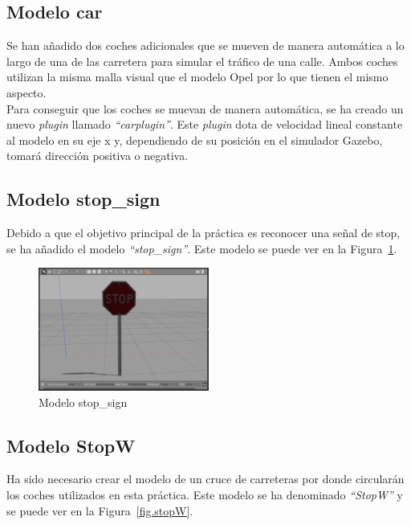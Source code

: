 \subsection{Modelo car}
Se han añadido dos coches adicionales que se mueven de manera automática a lo largo de una de las carretera para simular el tráfico de una calle. Ambos coches utilizan la misma malla visual que el modelo Opel por lo que tienen el mismo aspecto. \\

Para conseguir que los coches se muevan de manera automática, se ha creado un nuevo \textit{plugin} llamado \textit{``carplugin''}. Este \textit{plugin} dota de velocidad lineal constante al modelo en su eje x y, dependiendo de su posición en el simulador Gazebo, tomará dirección positiva o negativa.


\subsection{Modelo stop\_sign}
Debido a que el objetivo principal de la práctica es reconocer una señal de stop, se ha añadido el modelo \textit{``stop\_sign''}. Este modelo se puede ver en la Figura~\ref{fig.stopSign}.

\begin{figure}[H]
  \begin{center}
    \includegraphics[width=0.5\textwidth]{figures/Stop/stopSign.png}
		\caption{Modelo stop\_sign}
		\label{fig.stopSign}
		\end{center}
\end{figure}

\subsection{Modelo StopW}
Ha sido necesario crear el modelo de un cruce de carreteras por donde circularán los coches utilizados en esta práctica. Este modelo se ha denominado \textit{``StopW''} y se puede ver en la Figura~\ref{fig.stopW}. 

